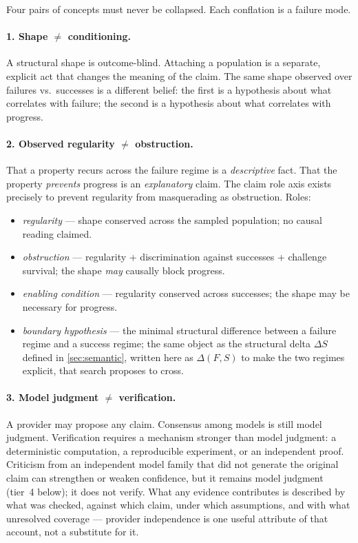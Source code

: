 \documentclass[11pt]{article}
\theoremstyle{gowthm}
\theoremstyle{gowplain}
\begin{document}
Four pairs of concepts must never be collapsed. Each conflation is a failure
mode.

\paragraph{1. Shape $\neq$ conditioning.}
A structural shape is outcome-blind. Attaching a population is a separate,
explicit act that changes the meaning of the claim. The same shape observed
over failures vs.\ successes is a different belief: the first is a hypothesis
about what correlates with failure; the second is a hypothesis about what
correlates with progress.

\paragraph{2. Observed regularity $\neq$ obstruction.}
That a property recurs across the failure regime is a \emph{descriptive} fact.
That the property \emph{prevents} progress is an \emph{explanatory} claim.
The claim role axis exists precisely to prevent regularity from masquerading as
obstruction. Roles:
\begin{itemize}[nosep]
  \item \emph{regularity} --- shape conserved across the sampled population;
    no causal reading claimed.
  \item \emph{obstruction} --- regularity + discrimination against successes +
    challenge survival; the shape \emph{may} causally block progress.
  \item \emph{enabling condition} --- regularity conserved across successes;
    the shape may be necessary for progress.
  \item \emph{boundary hypothesis} --- the minimal structural difference between
    a failure regime and a success regime; the same object as the structural
    delta $\Delta S$ defined in \cref{sec:semantic}, written here as
    $\Delta(F, S)$ to make the two regimes explicit, that search
    proposes to cross.
\end{itemize}

\paragraph{3. Model judgment $\neq$ verification.}
A provider may propose any claim. Consensus among models is still model judgment.
Verification requires a mechanism stronger than model judgment: a
deterministic computation, a reproducible experiment, or an independent proof.
Criticism from an independent model family that did not generate the original
claim can strengthen or weaken confidence, but it remains model judgment
(tier~4 below); it does not verify. What any evidence contributes is described
by what was checked, against which claim, under which assumptions, and with
what unresolved coverage --- provider independence is one useful attribute of
that account, not a substitute for it.
\end{document}

